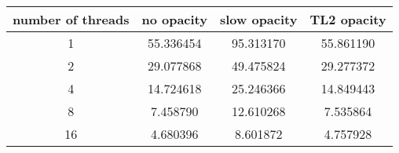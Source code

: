 \begin{tabular}{ |c|c|c|c| }
\hline
number of threads & no opacity & slow opacity & TL2 opacity\\\hline
1 & 55.336454 & 95.313170 & 55.861190\\\hline
2 & 29.077868 & 49.475824 & 29.277372\\\hline
4 & 14.724618 & 25.246366 & 14.849443\\\hline
8 & 7.458790 & 12.610268 & 7.535864\\\hline
16 & 4.680396 & 8.601872 & 4.757928\\\hline
\end{tabular}


